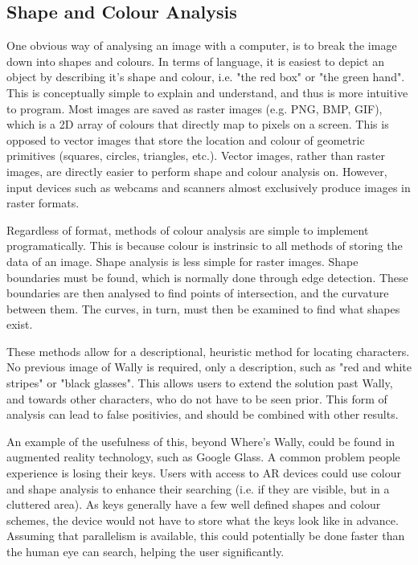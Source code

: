 \documentclass[../main.tex]{subfiles}
\begin{document}
    \subsection{Shape and Colour Analysis}
    One obvious way of analysing an image with a computer, is to break the image down into shapes and colours.
    In terms of language, it is easiest to depict an object by describing it's shape and colour, i.e. "the red box" or "the green hand".
    This is conceptually simple to explain and understand, and thus is more intuitive to program.
    Most images are saved as raster images (e.g. PNG, BMP, GIF), which is a 2D array of colours that directly map to pixels on a screen.
    This is opposed to vector images that store the location and colour of geometric primitives (squares, circles, triangles, etc.).
    Vector images, rather than raster images, are directly easier to perform shape and colour analysis on.
    However, input devices such as webcams and scanners almost exclusively produce images in raster formats.

    Regardless of format, methods of colour analysis are simple to implement programatically.
    This is because colour is instrinsic to all methods of storing the data of an image.
    Shape analysis is less simple for raster images.
    Shape boundaries must be found, which is normally done through edge detection.
    These boundaries are then analysed to find points of intersection, and the curvature between them.
    The curves, in turn, must then be examined to find what shapes exist.

    These methods allow for a descriptional, heuristic method for locating characters.
    No previous image of Wally is required, only a description, such as "red and white stripes" or "black glasses".
    This allows users to extend the solution past Wally, and towards other characters, who do not have to be seen prior.
    This form of analysis can lead to false positivies, and should be combined with other results.

    An example of the usefulness of this, beyond Where's Wally, could be found in augmented reality technology, such as Google Glass.
    A common problem people experience is losing their keys.
    Users with access to AR devices could use colour and shape analysis to enhance their searching (i.e. if they are visible, but in a cluttered area).
    As keys generally have a few well defined shapes and colour schemes, the device would not have to store what the keys look like in advance.
    Assuming that parallelism is available, this could potentially be done faster than the human eye can search, helping the user significantly.
    
\end{document}
